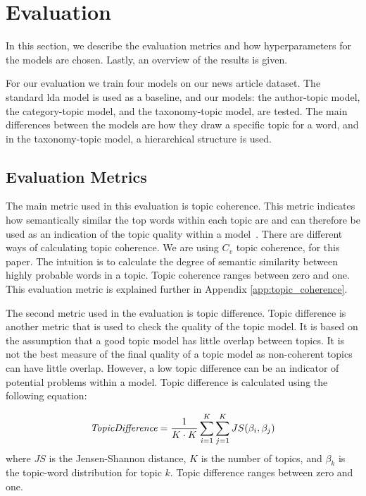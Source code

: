 \section{Evaluation}\label{sec:experiment}
In this section, we describe the evaluation metrics and how hyperparameters for the models are chosen.
Lastly, an overview of the results is given.

For our evaluation we train four models on our news article dataset.
The standard \gls{lda} model is used as a baseline, and our models: the author-topic model, the category-topic model, and the taxonomy-topic model, are tested.
The main differences between the models are how they draw a specific topic for a word, and in the taxonomy-topic model, a hierarchical structure is used.

\subsection{Evaluation Metrics}\label{sec:experiment_metrics}
The main metric used in this evaluation is topic coherence\cite{Syed2017coherence}.
This metric indicates how semantically similar the top words within each topic are and can therefore be used as an indication of the topic quality within a model~\cite{topic_coherence_2015}.
There are different ways of calculating topic coherence.
We are using $C_v$ topic coherence, for this paper.
The intuition is to calculate the degree of semantic similarity between highly probable words in a topic.
Topic coherence ranges between zero and one.
This evaluation metric is explained further in Appendix \autoref{app:topic_coherence}.

The second metric used in the evaluation is topic difference.
Topic difference is another metric that is used to check the quality of the topic model.
It is based on the assumption that a good topic model has little overlap between topics.
It is not the best measure of the final quality of a topic model as non-coherent topics can have little overlap.
However, a low topic difference can be an indicator of potential problems within a model.
Topic difference is calculated using the following equation:

\begin{equation}
	\emph{TopicDifference} = \frac{1}{K \cdot K} \sum_{i=1}^{K} \sum_{j=1}^{K} JS(\beta_{i},\beta_{j})
\end{equation}
\noindent where $JS$ is the Jensen-Shannon distance, $K$ is the number of topics, and $\beta_{k}$ is the topic-word distribution for topic $k$.
Topic difference ranges between zero and one.

